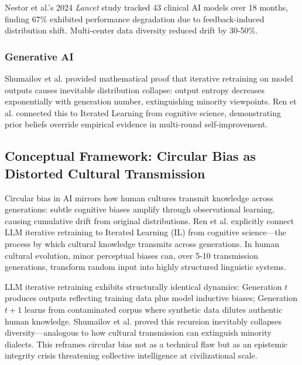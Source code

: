 \documentclass[11pt]{article}
\begin{document}
Nestor et al.'s\cite{nestor2024} 2024 \textit{Lancet} study tracked 43 clinical AI models over 18 months, finding 67\% exhibited performance degradation due to feedback-induced distribution shift. Multi-center data diversity reduced drift by 30-50\%\cite{varoquaux2022}.

\subsubsection{Generative AI}

Shumailov et al.\cite{shumailov2024} provided mathematical proof that iterative retraining on model outputs causes inevitable distribution collapse: output entropy decreases exponentially with generation number, extinguishing minority viewpoints. Ren et al.\cite{ren2024} connected this to Iterated Learning from cognitive science, demonstrating prior beliefs override empirical evidence in multi-round self-improvement.

\subsection{Conceptual Framework: Circular Bias as Distorted Cultural Transmission}

\begin{tcolorbox}[colback=gray!10,colframe=black,title=\textbf{Box 1 | Distorted Cultural Transmission}]
Circular bias in AI mirrors how human cultures transmit knowledge across generations: subtle cognitive biases amplify through observational learning, causing cumulative drift from original distributions. Ren et al.\cite{ren2024} explicitly connect LLM iterative retraining to Iterated Learning (IL) from cognitive science—the process by which cultural knowledge transmits across generations. In human cultural evolution, minor perceptual biases can, over 5-10 transmission generations, transform random input into highly structured linguistic systems.

LLM iterative retraining exhibits structurally identical dynamics: Generation $t$ produces outputs reflecting training data plus model inductive biases; Generation $t+1$ learns from contaminated corpus where synthetic data dilutes authentic human knowledge. Shumailov et al.\cite{shumailov2024} proved this recursion inevitably collapses diversity—analogous to how cultural transmission can extinguish minority dialects. This reframes circular bias not as a technical flaw but as an epistemic integrity crisis threatening collective intelligence at civilizational scale.
\end{tcolorbox}
\end{document}
